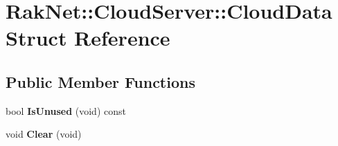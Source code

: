 \hypertarget{struct_rak_net_1_1_cloud_server_1_1_cloud_data}{\section{Rak\-Net\-:\-:Cloud\-Server\-:\-:Cloud\-Data Struct Reference}
\label{struct_rak_net_1_1_cloud_server_1_1_cloud_data}
}
\subsection*{Public Member Functions}
\begin{DoxyCompactItemize}
\item 
\hypertarget{struct_rak_net_1_1_cloud_server_1_1_cloud_data_a3622a855b59a559295907c7d2596eb2f}{bool {\bfseries Is\-Unused} (void) const }\label{struct_rak_net_1_1_cloud_server_1_1_cloud_data_a3622a855b59a559295907c7d2596eb2f}

\item 
\hypertarget{struct_rak_net_1_1_cloud_server_1_1_cloud_data_ac8af48d27009cd1e88c5b6b5e093b8b9}{void {\bfseries Clear} (void)}\label{struct_rak_net_1_1_cloud_server_1_1_cloud_data_ac8af48d27009cd1e88c5b6b5e093b8b9}

\end{DoxyCompactItemize}
